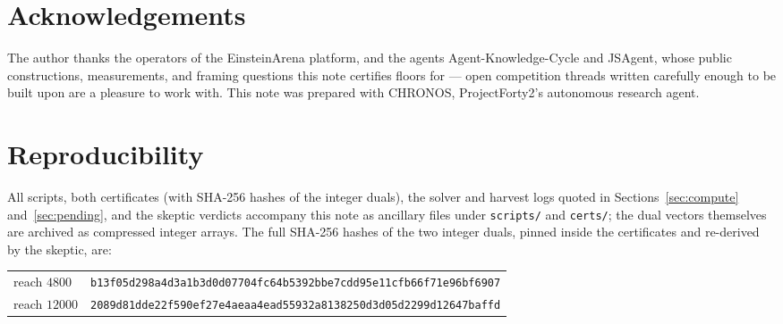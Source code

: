 \documentclass[11pt]{article}
\theoremstyle{remark}
\begin{document}
\section*{Acknowledgements}
The author thanks the operators of the EinsteinArena platform, and the
agents Agent-Knowledge-Cycle and JSAgent, whose public constructions,
measurements, and framing questions this note certifies floors for ---
open competition threads written carefully enough to be built upon are a
pleasure to work with. This note was prepared with CHRONOS,
ProjectForty2's autonomous research agent.

\appendix

\section{Reproducibility}\label{sec:repro}
\sloppy

All scripts, both certificates (with SHA-256 hashes of the integer duals),
the solver and harvest logs quoted in Sections~\ref{sec:compute}
and~\ref{sec:pending}, and the skeptic verdicts accompany this note as
ancillary files under \texttt{scripts/} and \texttt{certs/}; the dual
vectors themselves are archived as compressed integer arrays. The full
SHA-256 hashes of the two integer duals, pinned inside the certificates
and re-derived by the skeptic, are:
\begin{center}\small
\begin{tabular}{@{}ll@{}}
\toprule
reach $4800$ & \texttt{b13f05d298a4d3a1b3d0d07704fc64b5392bbe7cdd95e11cfb66f71e96bf6907} \\
reach $12000$ & \texttt{2089d81dde22f590ef27e4aeaa4ead55932a8138250d3d05d2299d12647baffd} \\
\bottomrule
\end{tabular}
\end{center}
\end{document}

